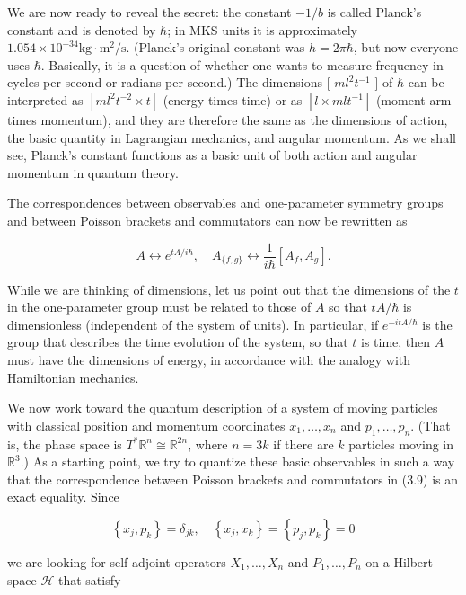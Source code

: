 \documentclass[10pt, letterpaper]{article}
\begin{document}
We are now ready to reveal the secret: the constant $-1 / b$ is called Planck's constant and is denoted by $\hbar$; in MKS units it is approximately $1.054 \times 10^{-34} \mathrm{kg} \cdot \mathrm{m}^{2} / \mathrm{s}$. (Planck's original constant was $h=2 \pi \hbar$, but now everyone uses $\hbar$. Basically, it is a question of whether one wants to measure frequency in cycles per second or radians per second.) The dimensions [ $m l^{2} t^{-1}$ ] of $\hbar$ can be interpreted as $\left[m l^{2} t^{-2} \times t\right]$ (energy times time) or as $\left[l \times m l t^{-1}\right]$ (moment arm times momentum), and they are therefore the same as the dimensions of action, the basic quantity in Lagrangian mechanics, and angular momentum. As we shall see, Planck's constant functions as a basic unit of both action and angular momentum in quantum theory.

The correspondences between observables and one-parameter symmetry groups and between Poisson brackets and commutators can now be rewritten as

$$
A \leftrightarrow e^{t A / i \hbar}, \quad A_{\{f, g\}} \leftrightarrow \frac{1}{i \hbar}\left[A_{f}, A_{g}\right] .
$$

While we are thinking of dimensions, let us point out that the dimensions of the $t$ in the one-parameter group must be related to those of $A$ so that $t A / \hbar$ is dimensionless (independent of the system of units). In particular, if $e^{-i t A / \hbar}$ is the group that describes the time evolution of the system, so that $t$ is time, then $A$ must have the dimensions of energy, in accordance with the analogy with Hamiltonian mechanics.

We now work toward the quantum description of a system of moving particles with classical position and momentum coordinates $x_{1}, \ldots, x_{n}$ and $p_{1}, \ldots, p_{n}$. (That is, the phase space is $T^{*} \mathbb{R}^{n} \cong \mathbb{R}^{2 n}$, where $n=3 k$ if there are $k$ particles moving in $\mathbb{R}^{3}$.) As a starting point, we try to quantize these basic observables in such a way that the correspondence between Poisson brackets and commutators in (3.9) is an exact equality. Since

$$
\left\{x_{j}, p_{k}\right\}=\delta_{j k}, \quad\left\{x_{j}, x_{k}\right\}=\left\{p_{j}, p_{k}\right\}=0
$$

we are looking for self-adjoint operators $X_{1}, \ldots, X_{n}$ and $P_{1}, \ldots, P_{n}$ on a Hilbert space $\mathcal{H}$ that satisfy
\end{document}
